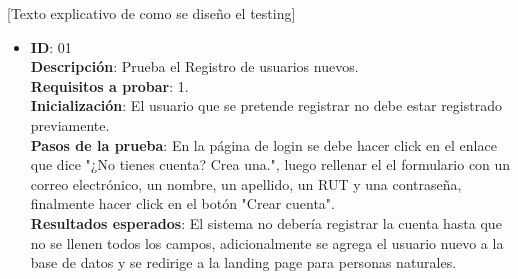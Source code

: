 [Texto explicativo de como se diseño el testing]
% 
\begin{itemize}
	\item \textbf{ID}: 01 \\
		\textbf{Descripción}: Prueba el Registro de usuarios nuevos. \\
		\textbf{Requisitos a probar}: 1.\\
		\textbf{Inicialización}: El usuario que se pretende registrar no debe estar registrado previamente.\\
		\textbf{Pasos de la prueba}: En la página de login se debe hacer click en el enlace que dice "¿No tienes cuenta? Crea una.", luego rellenar el el formulario con un correo electrónico, un nombre, un apellido, un RUT y una contraseña, finalmente hacer click en el botón "Crear cuenta".\\
		\textbf{Resultados esperados}: El sistema no debería registrar la cuenta hasta que no se llenen todos los campos, adicionalmente se agrega el usuario nuevo a la base de datos y se redirige a la landing page para personas naturales.\\
\end{itemize}